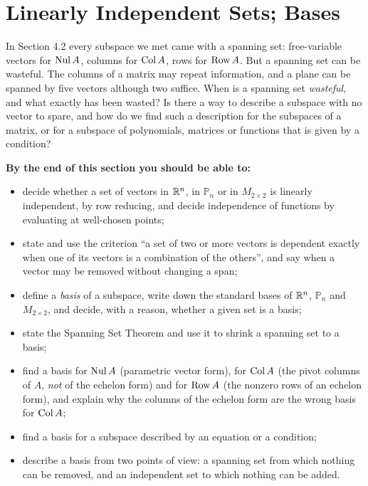 \documentclass[11pt]{article}
\begin{document}
\section{Linearly Independent Sets; Bases}

\begin{guide}
In Section 4.2 every subspace we met came with a spanning set: free-variable vectors for $\operatorname{Nul} A$, columns for $\operatorname{Col} A$, rows for $\operatorname{Row} A$. But a spanning set can be wasteful. The columns of a matrix may repeat information, and a plane can be spanned by five vectors although two suffice. When is a spanning set \emph{wasteful}, and what exactly has been wasted? Is there a way to describe a subspace with no vector to spare, and how do we find such a description for the subspaces of a matrix, or for a subspace of polynomials, matrices or functions that is given by a condition?
\end{guide}

\textbf{By the end of this section you should be able to:}
\begin{itemize}
  \item decide whether a set of vectors in $\mathbb{R}^n$, in $\mathbb{P}_n$ or in $M_{2\times2}$ is linearly independent, by row reducing, and decide independence of functions by evaluating at well-chosen points;
  \item state and use the criterion ``a set of two or more vectors is dependent exactly when one of its vectors is a combination of the others'', and say when a vector may be removed without changing a span;
  \item define a \emph{basis} of a subspace, write down the standard bases of $\mathbb{R}^n$, $\mathbb{P}_n$ and $M_{2\times2}$, and decide, with a reason, whether a given set is a basis;
  \item state the Spanning Set Theorem and use it to shrink a spanning set to a basis;
  \item find a basis for $\operatorname{Nul} A$ (parametric vector form), for $\operatorname{Col} A$ (the pivot columns of $A$, \emph{not} of the echelon form) and for $\operatorname{Row} A$ (the nonzero rows of an echelon form), and explain why the columns of the echelon form are the wrong basis for $\operatorname{Col} A$;
  \item find a basis for a subspace described by an equation or a condition;
  \item describe a basis from two points of view: a spanning set from which nothing can be removed, and an independent set to which nothing can be added.
\end{itemize}
\end{document}
